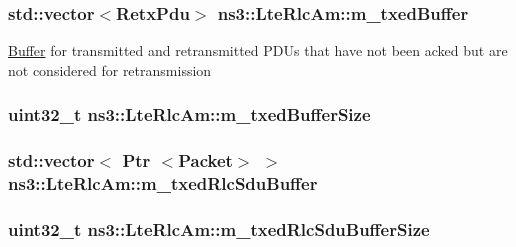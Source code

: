 \subsubsection[{\texorpdfstring{m\+\_\+txed\+Buffer}{m_txedBuffer}}]{\setlength{\rightskip}{0pt plus 5cm}std\+::vector$<${\bf Retx\+Pdu}$>$ ns3\+::\+Lte\+Rlc\+Am\+::m\+\_\+txed\+Buffer\hspace{0.3cm}{\ttfamily [private]}}\hypertarget{classns3_1_1LteRlcAm_afabb45c6de7da492347b45c139de0c28}{}\label{classns3_1_1LteRlcAm_afabb45c6de7da492347b45c139de0c28}
\hyperlink{classns3_1_1Buffer}{Buffer} for transmitted and retransmitted P\+D\+Us that have not been acked but are not considered for retransmission 
\subsubsection[{\texorpdfstring{m\+\_\+txed\+Buffer\+Size}{m_txedBufferSize}}]{\setlength{\rightskip}{0pt plus 5cm}uint32\+\_\+t ns3\+::\+Lte\+Rlc\+Am\+::m\+\_\+txed\+Buffer\+Size\hspace{0.3cm}{\ttfamily [private]}}\hypertarget{classns3_1_1LteRlcAm_add3fe05a0fd3a4ad1fcb7db0239c698f}{}\label{classns3_1_1LteRlcAm_add3fe05a0fd3a4ad1fcb7db0239c698f}
\subsubsection[{\texorpdfstring{m\+\_\+txed\+Rlc\+Sdu\+Buffer}{m_txedRlcSduBuffer}}]{\setlength{\rightskip}{0pt plus 5cm}std\+::vector$<$ {\bf Ptr} $<${\bf Packet}$>$ $>$ ns3\+::\+Lte\+Rlc\+Am\+::m\+\_\+txed\+Rlc\+Sdu\+Buffer\hspace{0.3cm}{\ttfamily [private]}}\hypertarget{classns3_1_1LteRlcAm_ad70b9a53e11a4ebf6e94f1fb9e86507e}{}\label{classns3_1_1LteRlcAm_ad70b9a53e11a4ebf6e94f1fb9e86507e}
\subsubsection[{\texorpdfstring{m\+\_\+txed\+Rlc\+Sdu\+Buffer\+Size}{m_txedRlcSduBufferSize}}]{\setlength{\rightskip}{0pt plus 5cm}uint32\+\_\+t ns3\+::\+Lte\+Rlc\+Am\+::m\+\_\+txed\+Rlc\+Sdu\+Buffer\+Size\hspace{0.3cm}{\ttfamily [private]}}\hypertarget{classns3_1_1LteRlcAm_a00aa9058dcff6947fa1c69697c564b75}{}\label{classns3_1_1LteRlcAm_a00aa9058dcff6947fa1c69697c564b75}
